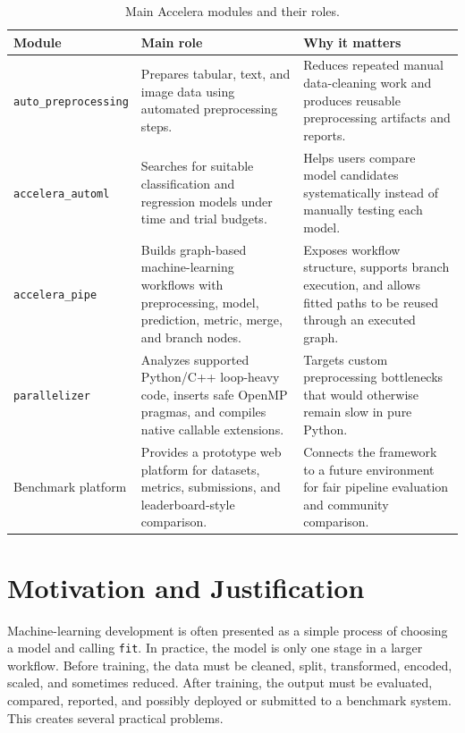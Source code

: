 \documentclass[12pt,a4paper]{report}
\begin{document}
\begin{table}[!htbp]
\centering
\caption{Main Accelera modules and their roles.}
\label{tab:intro-modules-overview}
\small
\renewcommand{\arraystretch}{1.15}
\setlength{\tabcolsep}{4pt}
\begin{tabular}{p{}p{}p{}}
\toprule
Module & Main role & Why it matters \\
\midrule
\texttt{auto\_preprocessing} &
Prepares tabular, text, and image data using automated preprocessing steps. &
Reduces repeated manual data-cleaning work and produces reusable preprocessing
artifacts and reports. \\

\texttt{accelera\_automl} &
Searches for suitable classification and regression models under time and trial
budgets. &
Helps users compare model candidates systematically instead of manually testing
each model. \\

\texttt{accelera\_pipe} &
Builds graph-based machine-learning workflows with preprocessing, model,
prediction, metric, merge, and branch nodes. &
Exposes workflow structure, supports branch execution, and allows fitted paths
to be reused through an executed graph. \\

\texttt{parallelizer} &
Analyzes supported Python/C++ loop-heavy code, inserts safe OpenMP pragmas, and
compiles native callable extensions. &
Targets custom preprocessing bottlenecks that would otherwise remain slow in
pure Python. \\

Benchmark platform &
Provides a prototype web platform for datasets, metrics, submissions, and
leaderboard-style comparison. &
Connects the framework to a future environment for fair pipeline evaluation and
community comparison. \\
\bottomrule
\end{tabular}
\renewcommand{\arraystretch}{1.0}
\end{table}

\section{Motivation and Justification}

Machine-learning development is often presented as a simple process of choosing
a model and calling \texttt{fit}. In practice, the model is only one stage in a
larger workflow. Before training, the data must be cleaned, split, transformed,
encoded, scaled, and sometimes reduced. After training, the output must be
evaluated, compared, reported, and possibly deployed or submitted to a benchmark
system. This creates several practical problems.
\end{document}
